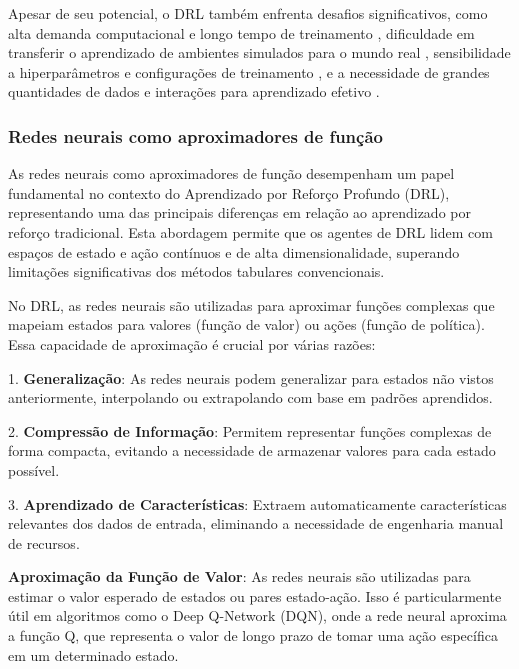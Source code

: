 Apesar de seu potencial, o DRL também enfrenta desafios significativos, como alta demanda computacional e longo tempo de treinamento \cite{Job2023TelemetriaAU, Kinoshita2022AprendizadoPR}, dificuldade em transferir o aprendizado de ambientes simulados para o mundo real \cite{Jesus2023AprendizadoPR, Grando2021AprendizadoPR}, sensibilidade a hiperparâmetros e configurações de treinamento \cite{Bezerra2021PropostaDC, Bezerra2023AprendizagemPR}, e a necessidade de grandes quantidades de dados e interações para aprendizado efetivo \cite{Bezerra2021PropostaDC, Bezerra2023AprendizagemPR}.


\subsubsection{Redes neurais como aproximadores de função}
\label{subsubsec:redes_neurais}

As redes neurais como aproximadores de função desempenham um papel fundamental no contexto do Aprendizado por Reforço Profundo (DRL), representando uma das principais diferenças em relação ao aprendizado por reforço tradicional. Esta abordagem permite que os agentes de DRL lidem com espaços de estado e ação contínuos e de alta dimensionalidade, superando limitações significativas dos métodos tabulares convencionais.


No DRL, as redes neurais são utilizadas para aproximar funções complexas que mapeiam estados para valores (função de valor) ou ações (função de política). Essa capacidade de aproximação é crucial por várias razões:

1. \textbf{Generalização}: As redes neurais podem generalizar para estados não vistos anteriormente, interpolando ou extrapolando com base em padrões aprendidos.

2. \textbf{Compressão de Informação}: Permitem representar funções complexas de forma compacta, evitando a necessidade de armazenar valores para cada estado possível.

3. \textbf{Aprendizado de Características}: Extraem automaticamente características relevantes dos dados de entrada, eliminando a necessidade de engenharia manual de recursos.


\textbf{Aproximação da Função de Valor}: As redes neurais são utilizadas para estimar o valor esperado de estados ou pares estado-ação. Isso é particularmente útil em algoritmos como o Deep Q-Network (DQN), onde a rede neural aproxima a função Q, que representa o valor de longo prazo de tomar uma ação específica em um determinado estado.

